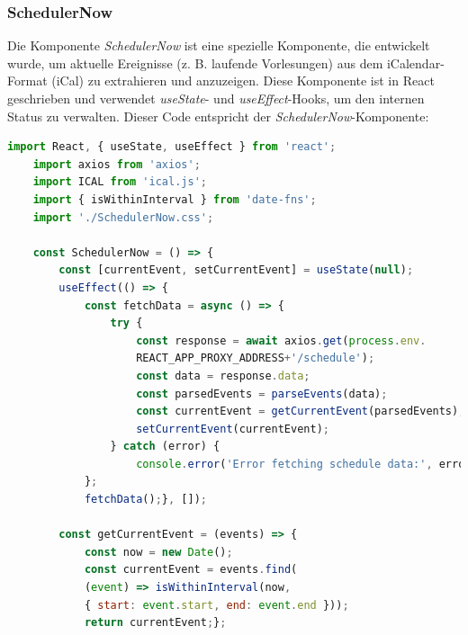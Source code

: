 \subsubsection{SchedulerNow}
Die Komponente \emph{SchedulerNow} ist eine spezielle Komponente, die entwickelt wurde, um  aktuelle Ereignisse (z. B. laufende Vorlesungen) aus dem iCalendar-Format (iCal) zu extrahieren und anzuzeigen. Diese Komponente ist in React geschrieben und verwendet \emph{useState}- und \emph{useEffect}-Hooks, um den internen Status zu verwalten. Dieser Code entspricht der \emph{SchedulerNow}-Komponente:

\begin{lstlisting}[language=JavaScript,
	frame=single,           % Ein Rahmen um den Code
	framexleftmargin=15pt,  % Rahmen link von den Zahlen
	style=algoBericht,
	label={SchedulerNow-Komponente},
	captionpos=b ,          % Caption unter den Code setzen
	caption={SchedulerNow-Komponente}]
	import React, { useState, useEffect } from 'react';
	import axios from 'axios';
	import ICAL from 'ical.js';
	import { isWithinInterval } from 'date-fns';
	import './SchedulerNow.css';
	
	const SchedulerNow = () => {
		const [currentEvent, setCurrentEvent] = useState(null);
		useEffect(() => {
			const fetchData = async () => {
				try {
					const response = await axios.get(process.env.
					REACT_APP_PROXY_ADDRESS+'/schedule');
					const data = response.data;
					const parsedEvents = parseEvents(data);
					const currentEvent = getCurrentEvent(parsedEvents);
					setCurrentEvent(currentEvent);
				} catch (error) {
					console.error('Error fetching schedule data:', error);}
			};
			fetchData();}, []);
		
		const getCurrentEvent = (events) => {
			const now = new Date();
			const currentEvent = events.find(
			(event) => isWithinInterval(now, 
			{ start: event.start, end: event.end }));
			return currentEvent;};
		

\end{lstlisting}
